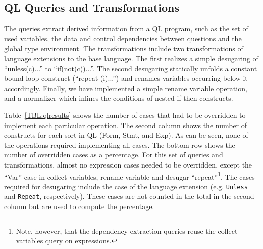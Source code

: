 \subsection{QL Queries and Transformations}

The queries extract derived information from a QL program, such as the set of used variables, the data and control dependencies between questions and the global type environment.
The transformations include two transformations of language extensions to the base language.
The first realizes a simple desugaring of ``unless(c){...}'' to ``if(not(c)){...}''.
The second desugaring statically unfolds a constant bound loop construct (``repeat (i){...}'') and renames variables occurring below it accordingly.
Finally, we have implemented a simple rename variable operation, and a normalizer which inlines the conditions of nested if-then constructs.

Table~\ref{TBL:qlresults} shows the number of cases that had to be overridden to implement each particular operation. The second column shows the number of  constructs for each sort in QL (Form, Stmt, and Exp).
As can be seen, none of the operations required implementing all cases.
The bottom row shows the number of overridden cases as a percentage.
For this set of queries and transformations, almost no expression cases needed to be overridden, except the ``Var'' case in collect variables, rename variable and desugar ``repeat''\footnote{Note, however, that the dependency extraction queries reuse the collect variables query on expressions.}.
The cases required for desugaring include the case of the language extension (e.g. \lstinline{Unless} and \lstinline{Repeat}, respectively). These cases are not counted in the total in the second column but are used to compute the percentage.


